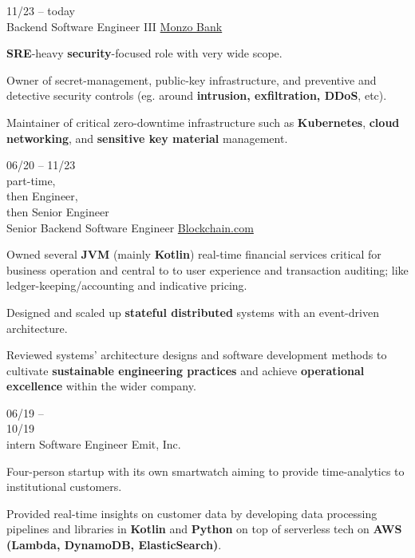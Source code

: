 \begin{entrylist}


    \entry
    {
        11/23 -- today \\
    }
    {Backend Software Engineer III}
    {\href{https://monzo.com}{Monzo Bank}}
    {
        \textbf{SRE}-heavy \textbf{security}-focused role with very wide scope.

        \para

        Owner of secret-management, public-key infrastructure, and preventive and detective security controls (eg. around \textbf{intrusion, exfiltration, DDoS}, etc).

        \para

        Maintainer of critical zero-downtime infrastructure such as \textbf{Kubernetes}, \textbf{cloud networking}, and \textbf{sensitive key material} management.
    }
    \entry
    {
        06/20 -- 11/23   \\\footnotesize{part-time,\\ then Engineer,\\ then Senior Engineer}        \\
    }
    {Senior Backend Software Engineer}
    {\href{https://blockchain.com/about}{Blockchain.com}}
    {
        Owned several \textbf{JVM} (mainly \textbf{Kotlin}) real-time financial services critical for business operation and central to
        to user experience and transaction auditing; like ledger-keeping/accounting and indicative pricing.

        \para
        Designed and scaled up \textbf{stateful distributed} systems with an event-driven architecture.

        \para
        Reviewed systems' architecture designs and software development methods to cultivate \textbf{sustainable engineering practices}
        and achieve \textbf{operational excellence} within the wider company.



    }
    \entry
    {06/19 --        \\ 10/19        \\\footnotesize{intern}}
    {Software Engineer}
    {Emit, Inc.}
    {
        Four-person startup with its own smartwatch aiming to provide time-analytics to
        institutional customers.

        \para
        Provided real-time insights on customer data by developing data processing pipelines and libraries in
        \textbf{Kotlin} and \textbf{Python} on top of serverless tech on \textbf{AWS (Lambda,
            DynamoDB, ElasticSearch)}.
    }
\end{entrylist}
